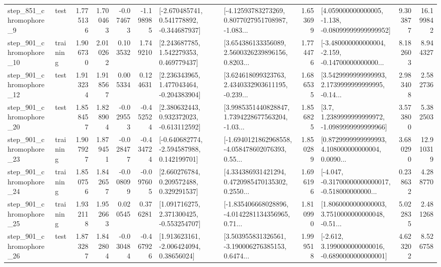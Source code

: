 \begin{tabular}{llrrrrllrlrr}
   step\_851\_chromophore\_9 &      test &      1.775136 &    1.700463 &     -0.074673 & -1.198985 &   [-2.670485741, 0.541778892, -0.344687937] &  [-4.12593783273269, 0.8077027951708987, -1.083... &       1.653699 &  [4.059000000000005, -1.138, -0.08099999999999952] &            9.303877 &         16.199842 \\
  step\_901\_chromophore\_10 &  training &      1.906730 &    2.010262 &      0.103532 &  1.749210 &     [2.243687785, 1.542279353, 0.469779437] &  [3.654386133356089, 2.5600326239896156, 0.8203... &       1.774476 &  [-3.480000000000004, -2.159, -0.14700000000000... &            8.182603 &          8.944327 \\
  step\_901\_chromophore\_12 &      test &      1.913234 &    1.918567 &      0.005334 &  0.124631 &    [2.236343965, 1.477043464, -0.204383904] &  [3.624618099323763, 2.4340332903611195, -0.239... &       1.686535 &  [3.5429999999999993, 2.1739999999999995, -0.14... &            2.983408 &          2.582736 \\
  step\_901\_chromophore\_20 &      test &      1.858457 &    1.828904 &     -0.029553 & -0.452524 &    [2.380632443, 0.932372023, -0.613112592] &  [3.9985351440828847, 1.7394228677563204, -1.03... &       1.856825 &     [3.7, 1.2389999999999972, -1.0989999999999966] &            3.573800 &          5.382503 \\
  step\_901\_chromophore\_23 &  training &      1.907927 &    1.879451 &     -0.028477 & -0.434724 &   [-0.640682774, -2.594587988, 0.142199701] &  [-1.6940121862968558, -4.058478602076393, 0.55... &       1.850289 &  [0.8729999999999993, 4.108000000000004, 0.0090... &            3.680290 &         12.910319 \\
  step\_901\_chromophore\_24 &  training &      1.850756 &    1.842657 &     -0.008099 & -0.097605 &     [2.660276784, 0.209572488, 0.329291537] &  [4.334386931421294, 0.4720985470135302, 0.2550... &       1.696196 &  [-4.047, -0.31700000000000017, -0.518000000000... &            0.238632 &          4.288770 \\
  step\_901\_chromophore\_25 &  training &      1.932118 &    1.952663 &      0.020545 &  0.376281 &    [1.091716275, 2.371300425, -0.553254707] &  [-1.835406668028896, -4.0142281134356965, 0.71... &       1.810990 &  [1.8060000000000003, 3.7510000000000048, -0.51... &            5.022835 &          2.481268 \\
  step\_901\_chromophore\_26 &      test &      1.873287 &    1.842804 &     -0.030484 & -0.467926 &     [1.913623161, -2.006424094, 0.38656024] &  [3.503955831326561, -3.190006276385153, 0.6474... &       1.999518 &  [-2.612, 3.1990000000000016, -0.6890000000000001] &            4.623202 &          8.526758 \\

\end{tabular}

